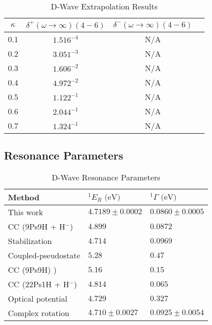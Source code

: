 \documentclass[Dissertation.tex]{subfiles}
\begin{document}
\begin{table}[H]
\centering
\begin{tabular}{c | c c c}
\toprule
$\kappa$ & $\delta^+ (\omega \rightarrow \infty) (4-6)$ & $\delta^- (\omega \rightarrow \infty) (4-6)$  \\
\midrule
0.1 & $1.516^{-4}$ & N/A \\
0.2 & $3.051^{-3}$ & N/A \\
0.3 & $1.606^{-2}$ & N/A \\
0.4 & $4.972^{-2}$ & N/A \\
0.5 & $1.122^{-1}$ & N/A \\
0.6 & $2.044^{-1}$ & N/A \\
0.7 & $1.324^{-1}$ & N/A \\
\bottomrule
\end{tabular}
\caption{D-Wave Extrapolation Results}
\label{tab:DWaveExtrap}
\end{table}



\subsection{Resonance Parameters}
\label{sec:DWaveResonance}



\setlength{\abovecaptionskip}{6pt}   %
\setlength{\belowcaptionskip}{6pt}   %
\begin{table}[H]
\centering
\begin{tabular}{l l l}
\toprule
Method & $^1E_R \text{ (eV)}$ & $^1\Gamma \text{ (eV)}$ \\
\midrule
This work & $4.7189 \pm 0.0002$ & $0.0860 \pm 0.0005$ \\
CC (9Ps9H + H$^-$) \cite{Walters2004} & $4.899$ & $0.0872$ \\
Stabilization \cite{Yan2003} & $4.714$ & $0.0969$ \\
Coupled-pseudostate \cite{Campbell1998} & $5.28$ & $0.47$ \\
CC (9Ps9H) \cite{Blackwood2002}) & $5.16$ & $0.15$ \\
CC (22Ps1H + H$^-$) \cite{Blackwood2002b} & $4.814$ & $0.065$ \\
Optical potential \cite{DiRienzi2002a} & $4.729$ & $0.327$ \\
Complex rotation \cite{Ho1998} & $4.710 \pm 0.0027$ & $0.0925 \pm 0.0054$  \\
\bottomrule
\end{tabular}
\caption{D-Wave Resonance Parameters}
\label{tab:DWaveResonancesOther}
\end{table}



\biblio
\end{document}
